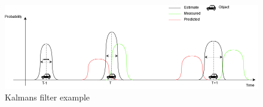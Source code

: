 \begin{figure}[H]
	\centering
	\includegraphics[width=0.7\linewidth]{positioning/positioning/DiagramKalman}
	\caption{Kalmans filter example}
	\label{fig:Kalmanfilter}
\end{figure}